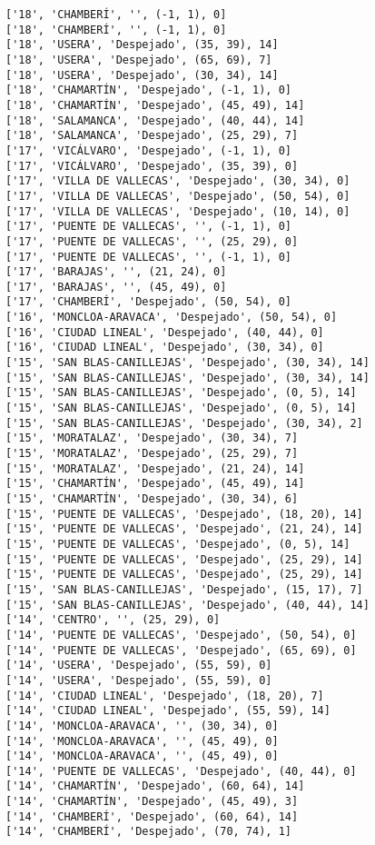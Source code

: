 \documentclass[11pt]{article}
\begin{document}
\begin{Verbatim}[commandchars=\\\{\}]
['18', 'CHAMBERÍ', '', (-1, 1), 0]
['18', 'CHAMBERÍ', '', (-1, 1), 0]
['18', 'USERA', 'Despejado', (35, 39), 14]
['18', 'USERA', 'Despejado', (65, 69), 7]
['18', 'USERA', 'Despejado', (30, 34), 14]
['18', 'CHAMARTÍN', 'Despejado', (-1, 1), 0]
['18', 'CHAMARTÍN', 'Despejado', (45, 49), 14]
['18', 'SALAMANCA', 'Despejado', (40, 44), 14]
['18', 'SALAMANCA', 'Despejado', (25, 29), 7]
['17', 'VICÁLVARO', 'Despejado', (-1, 1), 0]
['17', 'VICÁLVARO', 'Despejado', (35, 39), 0]
['17', 'VILLA DE VALLECAS', 'Despejado', (30, 34), 0]
['17', 'VILLA DE VALLECAS', 'Despejado', (50, 54), 0]
['17', 'VILLA DE VALLECAS', 'Despejado', (10, 14), 0]
['17', 'PUENTE DE VALLECAS', '', (-1, 1), 0]
['17', 'PUENTE DE VALLECAS', '', (25, 29), 0]
['17', 'PUENTE DE VALLECAS', '', (-1, 1), 0]
['17', 'BARAJAS', '', (21, 24), 0]
['17', 'BARAJAS', '', (45, 49), 0]
['17', 'CHAMBERÍ', 'Despejado', (50, 54), 0]
['16', 'MONCLOA-ARAVACA', 'Despejado', (50, 54), 0]
['16', 'CIUDAD LINEAL', 'Despejado', (40, 44), 0]
['16', 'CIUDAD LINEAL', 'Despejado', (30, 34), 0]
['15', 'SAN BLAS-CANILLEJAS', 'Despejado', (30, 34), 14]
['15', 'SAN BLAS-CANILLEJAS', 'Despejado', (30, 34), 14]
['15', 'SAN BLAS-CANILLEJAS', 'Despejado', (0, 5), 14]
['15', 'SAN BLAS-CANILLEJAS', 'Despejado', (0, 5), 14]
['15', 'SAN BLAS-CANILLEJAS', 'Despejado', (30, 34), 2]
['15', 'MORATALAZ', 'Despejado', (30, 34), 7]
['15', 'MORATALAZ', 'Despejado', (25, 29), 7]
['15', 'MORATALAZ', 'Despejado', (21, 24), 14]
['15', 'CHAMARTÍN', 'Despejado', (45, 49), 14]
['15', 'CHAMARTÍN', 'Despejado', (30, 34), 6]
['15', 'PUENTE DE VALLECAS', 'Despejado', (18, 20), 14]
['15', 'PUENTE DE VALLECAS', 'Despejado', (21, 24), 14]
['15', 'PUENTE DE VALLECAS', 'Despejado', (0, 5), 14]
['15', 'PUENTE DE VALLECAS', 'Despejado', (25, 29), 14]
['15', 'PUENTE DE VALLECAS', 'Despejado', (25, 29), 14]
['15', 'SAN BLAS-CANILLEJAS', 'Despejado', (15, 17), 7]
['15', 'SAN BLAS-CANILLEJAS', 'Despejado', (40, 44), 14]
['14', 'CENTRO', '', (25, 29), 0]
['14', 'PUENTE DE VALLECAS', 'Despejado', (50, 54), 0]
['14', 'PUENTE DE VALLECAS', 'Despejado', (65, 69), 0]
['14', 'USERA', 'Despejado', (55, 59), 0]
['14', 'USERA', 'Despejado', (55, 59), 0]
['14', 'CIUDAD LINEAL', 'Despejado', (18, 20), 7]
['14', 'CIUDAD LINEAL', 'Despejado', (55, 59), 14]
['14', 'MONCLOA-ARAVACA', '', (30, 34), 0]
['14', 'MONCLOA-ARAVACA', '', (45, 49), 0]
['14', 'MONCLOA-ARAVACA', '', (45, 49), 0]
['14', 'PUENTE DE VALLECAS', 'Despejado', (40, 44), 0]
['14', 'CHAMARTÍN', 'Despejado', (60, 64), 14]
['14', 'CHAMARTÍN', 'Despejado', (45, 49), 3]
['14', 'CHAMBERÍ', 'Despejado', (60, 64), 14]
['14', 'CHAMBERÍ', 'Despejado', (70, 74), 1]

\end{Verbatim}
\end{document}
